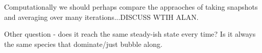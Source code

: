 Computationally we should perhaps compare the appraoches of taking snapshots and averaging over many iterations...DISCUSS WTIH ALAN.

Other question - does it reach the same steady-ish state every time? Is it always the same species that dominate/just bubble along.



